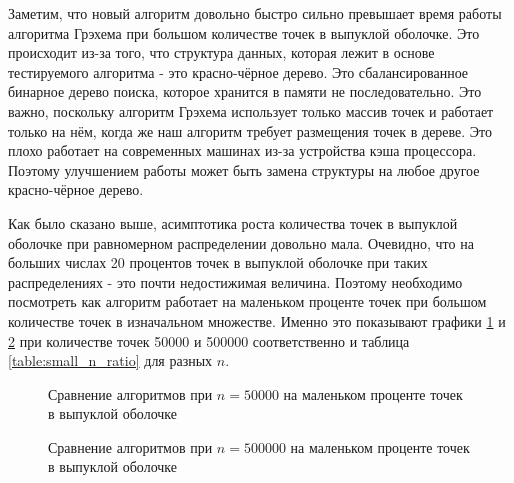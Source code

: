 Заметим, что новый алгоритм довольно быстро сильно превышает время работы алгоритма Грэхема при большом количестве точек в выпуклой оболочке. Это происходит из-за того, что структура данных, которая лежит в основе тестируемого алгоритма - это красно-чёрное дерево. Это сбалансированное бинарное дерево поиска, которое хранится в памяти не последовательно. Это важно, поскольку алгоритм Грэхема использует только массив точек и работает только на нём, когда же наш алгоритм требует размещения точек в дереве. Это плохо работает на современных машинах из-за устройства кэша процессора. Поэтому улучшением работы может быть замена структуры на любое другое красно-чёрное дерево.

Как было сказано выше, асимптотика роста количества точек в выпуклой оболочке при равномерном распределении довольно мала. Очевидно, что на больших числах 20 процентов точек в выпуклой оболочке при таких распределениях - это почти недостижимая величина. Поэтому необходимо посмотреть как алгоритм работает на маленьком проценте точек при большом количестве точек в изначальном множестве. Именно это показывают графики \ref{img:comparison2_50000} и \ref{img:comparison2_500000} при количестве точек 50000 и 500000 соответственно и таблица \ref{table:small_n_ratio} для разных $n$.

\begin{figure}[hbt]
	\centering
	
	\caption{Сравнение алгоритмов при $n = 50000$ на маленьком проценте точек в выпуклой оболочке}
	\label{img:comparison2_50000}
\end{figure}

\begin{figure}[hbt]
	\centering
	
	\caption{Сравнение алгоритмов при $n = 500000$ на маленьком проценте точек в выпуклой оболочке}
	\label{img:comparison2_500000}
\end{figure}

